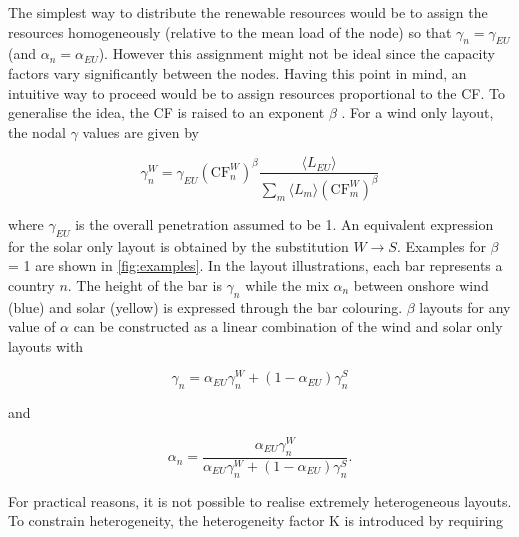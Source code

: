 \documentclass[a4paper, 5p, sort&compress]{elsarticle}%
\newcommand{\paren}[1]{\left(#1\right)}
\begin{document}
The simplest way to distribute the renewable resources would be to
assign the resources homogeneously (relative to the mean load of the
node) so that $\gamma_{n} = \gamma_{EU}$ (and $\alpha_{n} = \alpha_{EU}$). However this assignment
might not be ideal since the capacity factors vary significantly
between the nodes. Having this point in mind, an intuitive way to
proceed would be to assign resources proportional to the CF. To
generalise the idea, the CF is raised to an exponent $\beta$ %
\cite{Rolando}. For a wind only layout, the nodal $\gamma$ values are given by

\begin{equation}
  \label{eq:8}
  \gamma_{n}^{W} = \gamma_{EU} \paren{\text{CF}^{W}_{n}}^{\beta} \frac{\langle L_{EU}
    \rangle}{\sum_{m} \langle L_{m}
    \rangle \paren{\text{CF}^{W}_{m}}^{\beta}}
\end{equation}

where $\gamma_{EU}$ is the overall penetration assumed to be 1. An equivalent
expression for the solar only layout is obtained by the substitution
$W \to S$. Examples for $\beta$ = 1 are shown in \cref{fig:examples}. In
the layout illustrations, each bar represents a country $n$. The
height of the bar is $\gamma_{n}$ while the mix $\alpha_{n}$ between onshore
wind (blue) and solar (yellow) is expressed through the bar
colouring. $\beta$ layouts for any value of $\alpha$ can be constructed as a
linear combination of the wind and solar only layouts with


\begin{equation}
  \label{eq:9}
  \gamma_{n} = \alpha_{EU} \gamma^{W}_{n} + (1-\alpha_{EU}) \gamma^{S}_{n} 
\end{equation}

and

\begin{equation}
  \label{eq:9}
  \alpha_{n} = \frac{\alpha_{EU} \gamma_{n}^{W}}{\alpha_{EU} \gamma_{n}^{W} + (1-\alpha_{EU}) \gamma_{n}^{S}} .
\end{equation}


For practical reasons, it is not possible to realise extremely
heterogeneous layouts. To constrain heterogeneity, the heterogeneity
factor K is introduced by requiring
\end{document}
